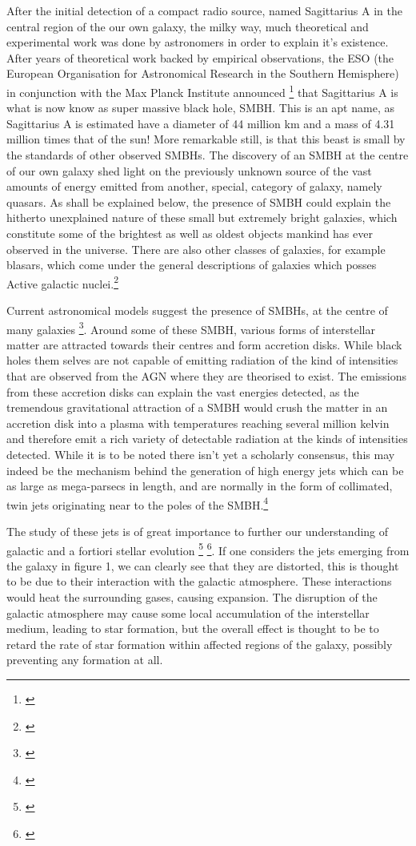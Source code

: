 \documentclass{article}
\begin{document}
After the initial detection of a compact radio source, named Sagittarius A in the central region of the our own galaxy, the milky way, much theoretical and experimental work was done by astronomers in order to explain it's existence. After years of theoretical work backed by empirical observations, the ESO (the European Organisation for Astronomical Research in the Southern Hemisphere) in conjunction with the Max Planck Institute announced \footnote{\cite{eso}} that Sagittarius A is what is now know as super massive black hole, SMBH. This is an apt name, as Sagittarius A is estimated have a diameter of 44 million km and a mass of 4.31 million times that of the sun! More remarkable still, is that this beast is small by the standards of other observed SMBHs. The discovery of an SMBH at the centre of our own galaxy shed light on the previously unknown source of the vast amounts of energy emitted from another, special, category of galaxy, namely quasars. As shall be explained below, the presence of SMBH could explain the hitherto unexplained nature of these small but extremely bright galaxies, which constitute some of the brightest as well as oldest objects mankind has ever observed in the universe. There are also other classes of galaxies, for example blasars, which come under the general descriptions of galaxies which posses Active galactic nuclei.\footnote{\cite{AGNhistory}}

Current astronomical models suggest the presence of SMBHs, at the centre of many galaxies \footnote{\cite {Robson1996Active}}. Around some of these SMBH, various forms of interstellar matter are attracted towards their centres and form accretion disks. While black holes them selves are not capable of emitting radiation of the kind of intensities that are observed from the AGN where they are theorised to exist. The emissions from these accretion disks can explain the vast energies detected, as the tremendous gravitational attraction of a SMBH would crush the matter in an accretion disk into a plasma with temperatures reaching several million kelvin and therefore emit a rich variety of detectable radiation at the kinds of intensities detected. While it is to be noted there isn't yet a scholarly consensus, this may indeed be the mechanism behind the generation of high energy jets which can be as large as mega-parsecs in length, and are normally in the form of collimated, twin jets originating near to the poles of the SMBH.\footnote{\cite{peterson}}

The study of these jets is of great importance to further our understanding of galactic and a fortiori stellar evolution \footnote{\cite{bhcaltech}} \footnote{\cite{bhgalaxyformation}}. If one considers the jets emerging from the galaxy in figure 1, we can clearly see that they are distorted, this is thought to be due to their interaction with the galactic atmosphere. These interactions would heat the surrounding gases, causing expansion. The disruption of the galactic atmosphere may cause some local accumulation of the interstellar medium, leading to star formation, but the overall effect is thought to be to retard the rate of star formation within affected regions of the galaxy, possibly preventing any formation at all.
\end{document}
